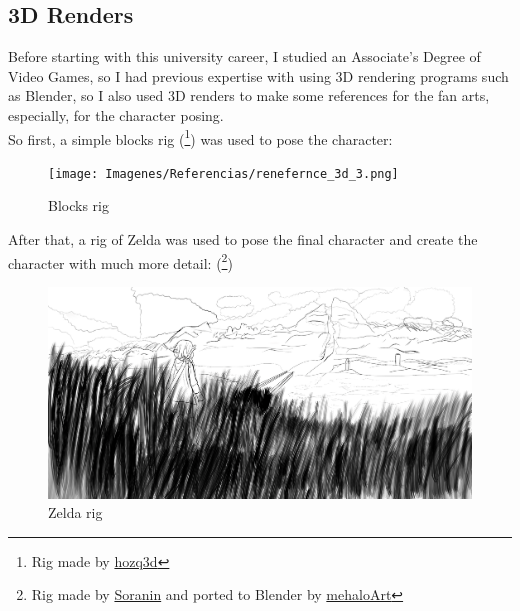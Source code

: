 \documentclass{cup-pan}
\begin{document}
    \subsection*{3D Renders}
    Before starting with this university career, I studied an Associate's Degree of Video Games, so I had previous expertise with using 3D rendering programs such as Blender, so I also used 3D renders to make some references for the fan arts, especially, for the character posing. \\

    So first, a simple blocks rig
        (\footnote{Rig made by 
        \href{https://hozq3d.gumroad.com/l/Blocks}{hozq3d}}) 
    was used to pose the character: 
    \begin{figure}[H]
        \texttt{[image: Imagenes/Referencias/renefernce\_3d\_3.png]}
        \caption{Blocks rig}
    \end{figure}

    After that, a rig of Zelda was used to pose the final character and create the character with much more detail:    
    (\footnote{Rig made by 
    \href{https://www.youtube.com/watch?v=1EUcGBMVRbA}{Soranin} and ported to Blender by  
    \href{https://twitter.com/mehaloArt/status/1528197222751383552?s=20}{mehaloArt}})

    \begin{figure}[H]
        \includegraphics[width=\textwidth]{Imagenes/Referencias/ref_zelda.png}
        \caption{Zelda rig}
    \end{figure}
\end{document}
